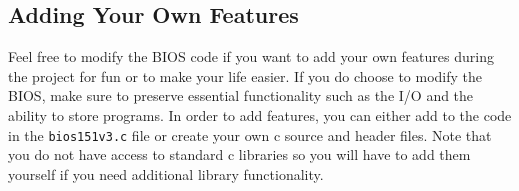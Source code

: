 \documentclass[11pt]{article}
\begin{document}
\begin{appendices}
\subsection{Adding Your Own Features}
Feel free to modify the BIOS code if you want to add your own features during the project for
fun or to make your life easier. If you do choose to modify the BIOS, make sure to preserve
essential functionality such as the I/O and the ability to store programs. In order to add
features, you can either add to the code in the \verb|bios151v3.c| file or create your own c source and
header files. Note that you do not have access to standard c libraries so you will have to add
them yourself if you need additional library functionality.

\pagebreak
\end{appendices}
\end{document}
